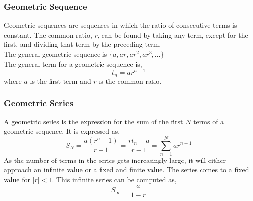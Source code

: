 \subsubsection{Geometric Sequence}
Geometric sequences are sequences in which the ratio of consecutive terms is constant. The common ratio, $r$, can be found by taking any term, except for the first, and dividing that term by the preceding term.\\
The general geometric sequence is $\{a,ar,ar^2,ar^3,\ldots\}$\\
The general term for a geometric sequence is,
$$t_n=ar^{n-1}$$
where $a$ is the first term and $r$ is the common ratio.

\subsubsection{Geometric Series}
A geometric series is the expression for the sum of the first $N$ terms of a geometric sequence. It is expressed as,
$$S_N=\frac{a(r^n-1)}{r-1}=\frac{rt_n-a}{r-1}=\sum \limits_{n=1}^N ar^{n-1}$$
As the number of terms in the series gets increasingly large, it will either approach an infinite value or a fixed and finite value. The series comes to a fixed value for $|r|<1$. This infinite series can be computed as,
$$S_\infty=\frac{a}{1-r}$$